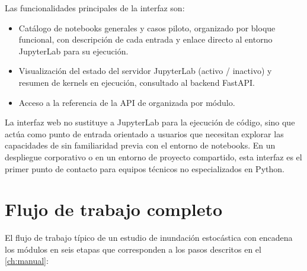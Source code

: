 Las funcionalidades principales de la interfaz son:

\begin{itemize}
  \item Catálogo de notebooks generales y casos piloto, organizado por bloque funcional, con descripción de cada entrada y enlace directo al entorno JupyterLab para su ejecución.
  \item Visualización del estado del servidor JupyterLab (activo / inactivo) y resumen de kernels en ejecución, consultado al backend FastAPI.
  \item Acceso a la referencia de la API de \pyhydra organizada por módulo.
\end{itemize}

La interfaz web no sustituye a JupyterLab para la ejecución de código, sino que actúa como punto de entrada orientado a usuarios que necesitan explorar las capacidades de \hydra sin familiaridad previa con el entorno de notebooks. En un despliegue corporativo o en un entorno de proyecto compartido, esta interfaz es el primer punto de contacto para equipos técnicos no especializados en Python.

\section{Flujo de trabajo completo}
\label{sec:flujo_completo}

El flujo de trabajo típico de un estudio de inundación estocástica con \hydra encadena los módulos en seis etapas que corresponden a los pasos descritos en el \cref{ch:manual}:

